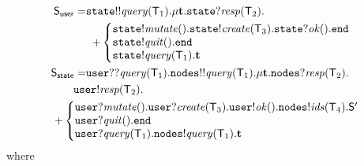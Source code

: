 \begin{align*}
\ST_\mathsf{user} = & 
\mathtt{state}{!!}\mathit{query}(\T_1).\mu \ty. 
\mathtt{state}{?}\mathit{resp}(\T_2).\\
& \hspace{2mm}
{+}
\left\{
\begin{array}{@{}l@{}}
\mathtt{state}{!}\mathit{mutate}().\mathtt{state}{!}\mathit{create}(\T_3).\mathtt{state}{?}\mathit{ok}().\tend\\
\mathtt{state}{!}\mathit{quit}().\tend\\
\mathtt{state}{!}\mathit{query}(\T_1).\ty
\end{array} \right.\\
%
\ST_\mathsf{state} = &
\mathtt{user}{??}\mathit{query}(\T_1).
\mathtt{nodes}{!!}\mathit{query}(\T_1). %
\mu \ty. 
\mathtt{nodes}{?}\mathit{resp}(\T_2).\\
& \hspace{-4mm} 
\mathtt{user}{!}\mathit{resp}(\T_2).\\
& \hspace{-10mm}
{+}
\left\{
\begin{array}{@{}l@{}}
\mathtt{user}{?}\mathit{mutate}().\mathtt{user}{?}\mathit{create}(\T_3).\mathtt{user}{!}\mathit{ok}().
\mathtt{nodes}{!}\mathit{ids}(\T_4).\ST'\\
\mathtt{user}{?}\mathit{quit}().\tend \\
\mathtt{user}{?}\mathit{query}(\T_1).\mathtt{nodes}{!}\mathit{query}(\T_1).\ty
\end{array} \right.
\end{align*}
where
